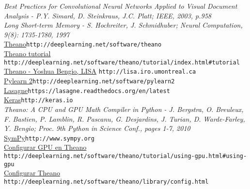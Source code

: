 \documentclass[12pt]{article}
\begin{document}
\textit{Best Practices for Convolutional Neural Networks Applied to Visual Document Analysis - P.Y. Simard, D. Steinkraus, J.C. Platt; IEEE, 2003, p.958}\\

\textit{Long Short-term Memory - S. Hochreiter, J. Schmidhuber; Neural Computation, 9(8): 1735-1780, 1997}\\

\href{http://deeplearning.net/software/theano}{Theano}\verb+http://deeplearning.net/software/theano+\\

\href{http://deeplearning.net/software/theano/tutorial/index.html#tutorial}{Theano tutorial}\\ 
\verb+http://deeplearning.net/software/theano/tutorial/index.html#tutorial+\\

\href{http://lisa.iro.umontreal.ca}{Theano - Yoshua Bengio, LISA} \verb+http://lisa.iro.umontreal.ca+\\

\href{http://deeplearning.net/software/pylearn2}{Pylearn 2}\verb+http://deeplearning.net/software/pylearn2+\\

\href{https://lasagne.readthedocs.org/en/latest}{Lasagne}\verb+https://lasagne.readthedocs.org/en/latest+\\

\href{http://keras.io}{Keras}\verb+http://keras.io+\\

\textit{Theano: A CPU and GPU Math Compiler in Python - J. Bergstra, O. Breuleux, F. Bastien, P. Lamblin, R. Pascanu, G. Desjardins, J. Turian, D. Warde-Farley, Y. Bengio; Proc. 9th Python in Science Conf., pages 1-7, 2010}\\

\href{http://www.sympy.org}{SymPy}\verb+http://www.sympy.org+\\


\href{http://deeplearning.net/software/theano/tutorial/using-gpu.html#using-gpu}{Configurar GPU en Theano}\\ \verb+http://deeplearning.net/software/theano/tutorial/using-gpu.html#using-gpu+\\

\href{http://deeplearning.net/software/theano/library/config.html}{Configurar Theano}\\ \verb+http://deeplearning.net/software/theano/library/config.html+\\
\end{document}
